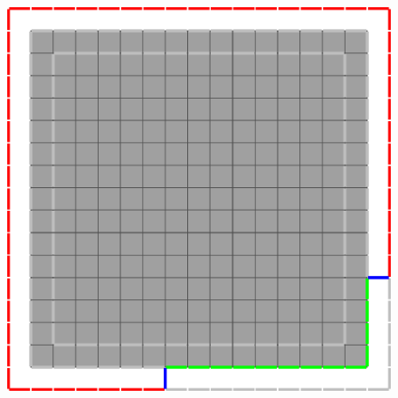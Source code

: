 \begin{figure}[]
{\includegraphics[scale=0.4]{figures/chapter5/gcurves/gc/main-outer.pdf}
}\hspace{1em}\\[1em]
\end{figure}
